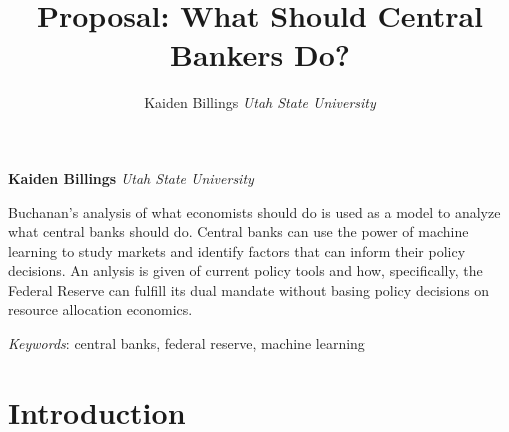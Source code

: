 \documentclass[11pt,]{article}
\title{Proposal: What Should Central Bankers Do?  }
\author{\Large Kaiden Billings\vspace{0.05in} \newline\normalsize\emph{Utah State University}  }
\date{}
\newcommand*{\authorfont}{\fontfamily{phv}\selectfont}
\renewenvironment{abstract}
 {{%
    \setlength{\leftmargin}{0mm}
    \setlength{\rightmargin}{\leftmargin}%
  }%
  \relax}
 {\endlist}
\begin{document}
	
%

{%
\setlength{\parindent}{0pt}
\thispagestyle{plain}
{\fontsize{18}{20}\selectfont\raggedright 
\maketitle  %

}

{
   \vskip 13.5pt\relax \normalsize\fontsize{11}{12} 
\textbf{\authorfont Kaiden Billings} \hskip 15pt \emph{\small Utah State University}   

}

}







\begin{abstract}

    \hbox{\vrule height .2pt width 39.14pc}

    \vskip 8.5pt %

\noindent Buchanan's analysis of what economists should do is used as a model to
analyze what central banks should do. Central banks can use the power of
machine learning to study markets and identify factors that can inform
their policy decisions. An anlysis is given of current policy tools and
how, specifically, the Federal Reserve can fulfill its dual mandate
without basing policy decisions on resource allocation economics.


\vskip 8.5pt \noindent \emph{Keywords}: central banks, federal reserve, machine learning \par

    \hbox{\vrule height .2pt width 39.14pc}



\end{abstract}


\vskip 6.5pt

\noindent \doublespacing \begin{quote}
\end{quote}

\section{Introduction}\label{introduction}
\end{document}
